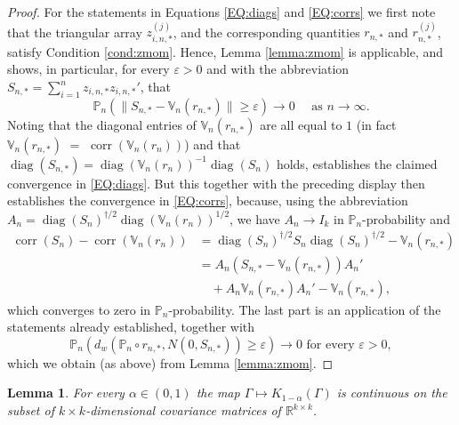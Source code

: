 \documentclass[preprint]{imsart}
\newcommand{\R}{{\mathbb R}}
\newcommand{\eps}{\varepsilon}
\DeclareMathOperator{\diag}{diag}
\DeclareMathOperator{\corr}{corr}
\newtheorem{lemma}[theorem]{Lemma}
\numberwithin{equation}{section}
\begin{document}
\begin{proof}
For the statements in Equations \eqref{EQ:diags} and \eqref{EQ:corrs} we first note that the triangular array $z_{i,n,*}^{(j)}$, and the corresponding quantities $r_{n, *}$ and $r_{n,*}^{(j)}$, satisfy Condition \ref{cond:zmom}. Hence, Lemma \ref{lemma:zmom} is applicable, and shows, in particular, for every $\varepsilon > 0$ and with the abbreviation $S_{n,*} = \sum_{i = 1}^n z_{i,n,*} z_{i,n,*}'$, that
%
\begin{equation}
\mathbb{P}_n \left(\| S_{n,*} -\mathbb{V}_n(r_{n, *}) \| \geq \varepsilon   \right) \to 0 \quad \text{ as } n \rightarrow \infty .
\end{equation}
%
Noting that the diagonal entries of $\mathbb{V}_n(r_{n, *})$ are all equal to $1$ (in fact $\mathbb{V}_n(r_{n, *})$ $=$ $\corr (\mathbb{V}_n(r_{n}))$) and that $\diag \left(S_{n,*}\right) = \diag(\mathbb{V}_n(r_n))^{-1} \diag(S_n)$ holds, establishes the claimed convergence in \eqref{EQ:diags}. But this together with the preceding display then establishes the convergence in \eqref{EQ:corrs}, because, using the abbreviation $A_n = \diag(S_n)^{\dagger/2}\diag(\mathbb{V}_n(r_n))^{1/2}$, we have $A_n \to I_k$ in $\mathbb{P}_n$-probability and
\begin{align*}
\corr(S_n) - \corr(\mathbb{V}_n(r_n))
&=
\diag(S_n)^{\dagger/2} S_n \diag(S_n)^{\dagger/2} - \mathbb{V}_n(r_{n,*})\\
&=
A_n (S_{n,*} - \mathbb{V}_n(r_{n,*}) ) A_n' \\
&\quad+ A_n \mathbb{V}_n(r_{n,*}) A_n' -  \mathbb{V}_n(r_{n,*}),
 \end{align*}
 which converges to zero in $\mathbb{P}_n$-probability.
The last part is an application of the statements already established, together with 
%
\begin{equation}
\mathbb{P}_n \left( d_w\left( \mathbb{P}_n \circ r_{n, *}, N(0, S_{n,*})  \right)  \geq \eps \right) \to 0 \text{ for every } \eps > 0,
\end{equation}
%
which we obtain (as above) from Lemma \ref{lemma:zmom}. 
\end{proof}


\begin{lemma}\label{lemma:POSIcont}
For every $\alpha \in (0, 1)$ the map $\Gamma \mapsto K_{1-\alpha}(\Gamma)$ is continuous on the subset of $k \times k$-dimensional covariance matrices of $\R^{k \times k}$. 
\end{lemma}
\end{document}
